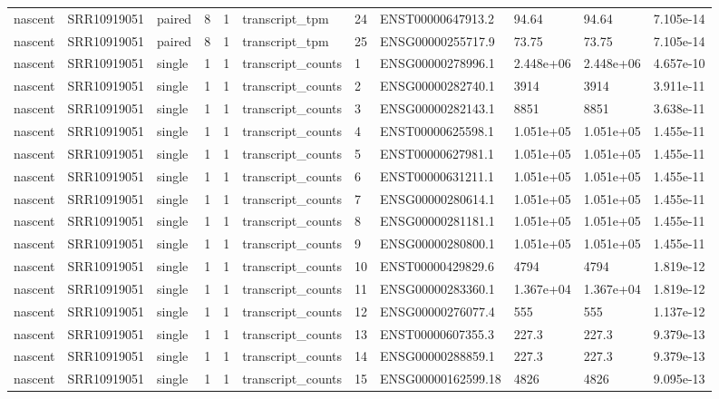\begin{tabular}{lllllllllll}
nascent & SRR10919051 & paired & 8 & 1 & transcript\_tpm & 24 & ENST00000647913.2 & 94.64 & 94.64 & 7.105e-14 \\
nascent & SRR10919051 & paired & 8 & 1 & transcript\_tpm & 25 & ENSG00000255717.9 & 73.75 & 73.75 & 7.105e-14 \\
nascent & SRR10919051 & single & 1 & 1 & transcript\_counts & 1 & ENSG00000278996.1 & 2.448e+06 & 2.448e+06 & 4.657e-10 \\
nascent & SRR10919051 & single & 1 & 1 & transcript\_counts & 2 & ENSG00000282740.1 & 3914 & 3914 & 3.911e-11 \\
nascent & SRR10919051 & single & 1 & 1 & transcript\_counts & 3 & ENSG00000282143.1 & 8851 & 8851 & 3.638e-11 \\
nascent & SRR10919051 & single & 1 & 1 & transcript\_counts & 4 & ENST00000625598.1 & 1.051e+05 & 1.051e+05 & 1.455e-11 \\
nascent & SRR10919051 & single & 1 & 1 & transcript\_counts & 5 & ENST00000627981.1 & 1.051e+05 & 1.051e+05 & 1.455e-11 \\
nascent & SRR10919051 & single & 1 & 1 & transcript\_counts & 6 & ENST00000631211.1 & 1.051e+05 & 1.051e+05 & 1.455e-11 \\
nascent & SRR10919051 & single & 1 & 1 & transcript\_counts & 7 & ENSG00000280614.1 & 1.051e+05 & 1.051e+05 & 1.455e-11 \\
nascent & SRR10919051 & single & 1 & 1 & transcript\_counts & 8 & ENSG00000281181.1 & 1.051e+05 & 1.051e+05 & 1.455e-11 \\
nascent & SRR10919051 & single & 1 & 1 & transcript\_counts & 9 & ENSG00000280800.1 & 1.051e+05 & 1.051e+05 & 1.455e-11 \\
nascent & SRR10919051 & single & 1 & 1 & transcript\_counts & 10 & ENST00000429829.6 & 4794 & 4794 & 1.819e-12 \\
nascent & SRR10919051 & single & 1 & 1 & transcript\_counts & 11 & ENSG00000283360.1 & 1.367e+04 & 1.367e+04 & 1.819e-12 \\
nascent & SRR10919051 & single & 1 & 1 & transcript\_counts & 12 & ENSG00000276077.4 & 555 & 555 & 1.137e-12 \\
nascent & SRR10919051 & single & 1 & 1 & transcript\_counts & 13 & ENST00000607355.3 & 227.3 & 227.3 & 9.379e-13 \\
nascent & SRR10919051 & single & 1 & 1 & transcript\_counts & 14 & ENSG00000288859.1 & 227.3 & 227.3 & 9.379e-13 \\
nascent & SRR10919051 & single & 1 & 1 & transcript\_counts & 15 & ENSG00000162599.18 & 4826 & 4826 & 9.095e-13 \\

\end{tabular}
